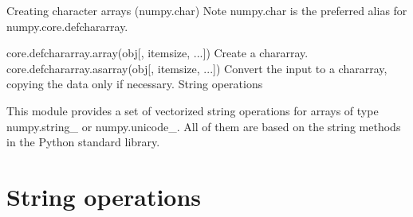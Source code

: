 Creating character arrays (numpy.char)
Note
numpy.char is the preferred alias for numpy.core.defchararray.

core.defchararray.array(obj[, itemsize, ...])	Create a chararray.
core.defchararray.asarray(obj[, itemsize, ...])	Convert the input to a chararray, copying the data only if necessary.
String operations

This module provides a set of vectorized string operations for arrays of type numpy.string_ or numpy.unicode_. All of them are based on the string methods in the Python standard library.

\newpage
\section*{String operations}

